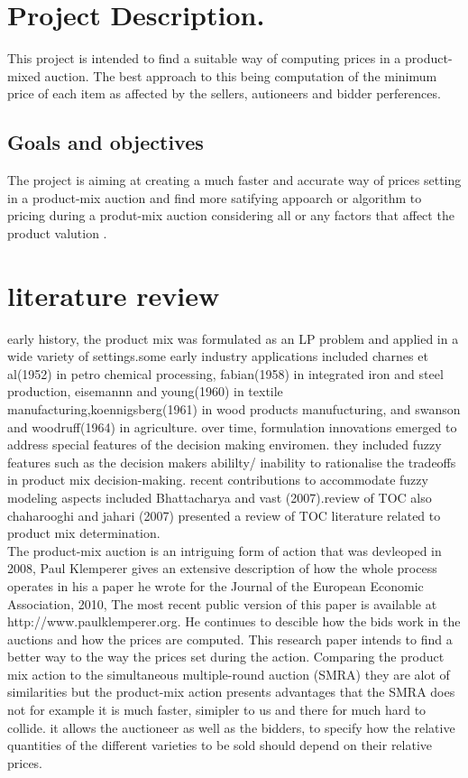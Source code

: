 \documentclass[11pt]{article} %
\begin{document}
\section{Project Description.}
This project is intended to find a  suitable way of computing prices in a product-mixed auction. The best approach to this being computation of the minimum price of each item as affected by the sellers, autioneers and bidder perferences.


 \subsection{Goals and objectives} 
 The project is aiming at creating a  much faster and accurate way of prices setting in a product-mix auction and find more satifying appoarch or algorithm to pricing during a produt-mix auction considering all or any factors that affect the product valution .
 
\section{literature review}
early history, the product mix was formulated as an LP problem and applied in a wide variety of settings.some early industry applications included charnes et al(1952) in petro chemical processing, fabian(1958) in integrated iron and steel production, eisemannn and young(1960) in textile manufacturing,koennigsberg(1961) in wood products manufucturing, and swanson and woodruff(1964) in agriculture. over time, formulation innovations emerged to address special features of the decision making enviromen. they included fuzzy features such as the decision makers abililty/ inability to rationalise the tradeoffs in product mix decision-making. recent contributions to accommodate fuzzy modeling aspects included Bhattacharya and vast (2007).review of TOC
also chaharooghi and jahari (2007) presented a review of TOC literature related to product mix determination.\\
The product-mix auction is an intriguing form of action that was devleoped in 2008, Paul Klemperer gives an extensive description of how the whole process operates in his a paper he wrote for the Journal of the European Economic Association, 2010, The most recent public version of this paper is available at http://www.paulklemperer.org. 
He continues to descible how the bids work in the auctions and how the prices are computed. This research paper intends to find a better way to the way the prices set during the action.
Comparing the product mix action to the simultaneous multiple-round auction (SMRA) they are alot of similarities but the product-mix action presents advantages that the SMRA does not for example it is much faster, simipler to us and there for much hard to collide.
it allows the auctioneer as well as the bidders, to specify how the relative quantities of the different varieties to be sold should depend on their relative prices.
\end{document}
